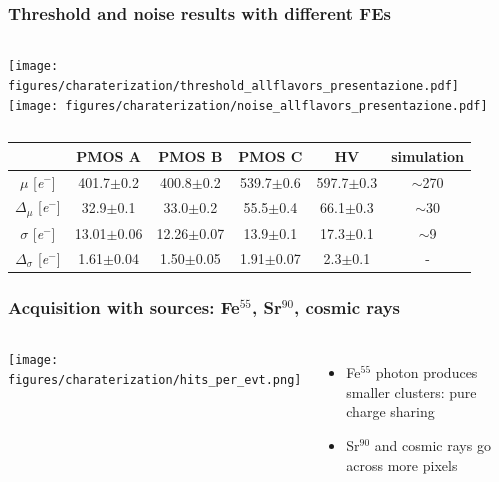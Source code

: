     \begin{frame}[noframenumbering]
        \frametitle{Threshold and noise results with different FEs}
        \begin{columns}
                \texttt{[image: figures/charaterization/threshold\_allflavors\_presentazione.pdf]}
                \texttt{[image: figures/charaterization/noise\_allflavors\_presentazione.pdf]} 
        \end{columns}                  
        \begin{table}[h!]
            \footnotesize
            \begin{tabular}{| c |  c | c | c |c || c|}
            \hline
            & PMOS A & PMOS B & PMOS C & HV & simulation \\
            \hline
            \hline
            $\mu$ [\si{\elementarycharge}$^-$] & 401.7$\pm$0.2 & 400.8$\pm$0.2 & 539.7$\pm$0.6 &  597.7$\pm$0.3 & $\sim$270\\
            $\Delta_{\mu}$ [\si{\elementarycharge}$^-$] & 32.9$\pm$0.1 & 33.0$\pm$0.2 & 55.5$\pm$0.4 & 66.1$\pm$0.3 & $\sim$30\\
            $\sigma$ [\si{\elementarycharge}$^-$] & 13.01$\pm$0.06 & 12.26$\pm$0.07 & 13.9$\pm$0.1 & 17.3$\pm$0.1 & $\sim$9 \\
            $\Delta_{\sigma}$ [\si{\elementarycharge}$^-$] & 1.61$\pm$0.04 & 1.50$\pm$0.05 & 1.91$\pm$0.07 & 2.3$\pm$0.1 & -\\
            \hline
            \end{tabular}
        \end{table}       
    \end{frame}




    \begin{frame}[noframenumbering]
        \frametitle{Acquisition with sources: Fe$^{55}$, Sr$^{90}$, cosmic rays}
        \begin{columns}
                \texttt{[image: figures/charaterization/hits\_per\_evt.png]}
                \begin{itemize}
                    \item Fe$^{55}$ photon produces smaller clusters: pure charge sharing
                    \item Sr$^{90}$ and cosmic rays go across more pixels 
                \end{itemize}    
        \end{columns}
    \end{frame}    

